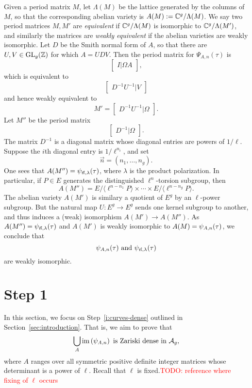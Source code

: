 \documentclass{amsart}
\begin{document}
Given a period matrix $M$, let $\Lambda(M)$ be the lattice generated by the columns of $M$, so that the corresponding abelian variety is $A(M) := \mathbb{C}^g/\Lambda(M)$. We say two period matrices $M, M'$ are \emph{equivalent} if $\mathbb{C}^g/\Lambda(M)$ is isomorphic to $\mathbb{C}^g/\Lambda(M')$, and similarly the matrices are \emph{weakly equivalent} if the abelian varieties are weakly isomorphic. Let $D$ be the Smith normal form of $A$, so that there are $U,V \in \operatorname{GL}_g(\mathbb{Z})$ for which $A = UDV$. Then the period matrix for $\Psi_{A,n}(\tau)$ is
\[
  \begin{bmatrix}
    I | \Omega A
  \end{bmatrix},
\]
which is equivalent to
\[
  \begin{bmatrix}
    D^{-1}U^{-1} | V
  \end{bmatrix}
\]
and hence weakly equivalent to
\[
M' = \begin{bmatrix}
    D^{-1}U^{-1} | \Omega
  \end{bmatrix}.
\]
Let $M''$ be the period matrix\[
  \begin{bmatrix}
    D^{-1} | \Omega
  \end{bmatrix}.
\]
The matrix $D^{-1}$ is a diagonal matrix whose diagonal entries are powers of $1/\ell$. Suppose the $i$th diagonal entry is $1/\ell^{n_i}$, and set
\[
  \vec{n} = (n_1, \ldots, n_g).
\]
One sees that $A(M'') = \psi_{\vec{n},\lambda}(\tau)$, where $\lambda$ is the product polarization. In particular, if $P \in E$ generates the distinguished $\ell^n$-torsion subgroup, then
\[
  A(M'') = E/\langle \ell^{n-n_1} P \rangle \times \cdots \times E/\langle \ell^{n-n_g} P \rangle.
\]
The abelian variety $A(M')$ is similary a quotient of $E^g$ by an $\ell$-power subgroup. But the natural map $U: E^g \to E^g$ sends one kernel subgroup to another, and thus induces a (weak) isomorphism $A(M') \to A(M'')$. As $A(M'') = \psi_{\vec{n},\lambda}(\tau)$ and $A(M')$ is weakly isomorphic to $A(M) = \psi_{A,n}(\tau)$, we conclude that
\[
\psi_{A,n}(\tau) \textrm{ and } \psi_{\vec{n},\lambda}(\tau)
\]
are weakly isomorphic.

\newpage

\section{Step 1}
\label{sec:step-1}

In this section, we focus on Step~\ref{i:curves-dense} outlined in Section~\ref{sec:introduction}. That is, we aim to prove that
\[
  \bigcup_{A} \operatorname{im}\left(\psi_{A,n}\right) \text{ is Zariski dense in } \mathcal{A}_g,
\]
where $A$ ranges over all symmetric positive definite integer matrices whose determinant is a power of $\ell$. Recall that $\ell$ is fixed.\textcolor{red}{TODO: reference where fixing of $\ell$ occurs}
\end{document}
